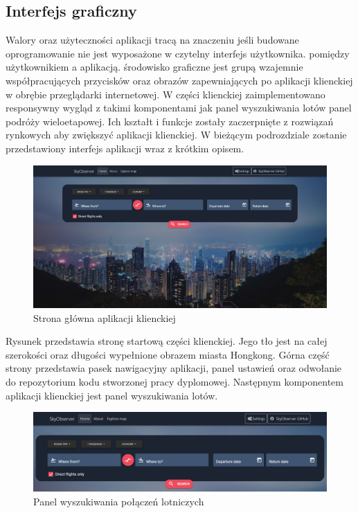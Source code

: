 \documentclass[12pt, twoside]{report}
\begin{document}
\subsection{Interfejs graficzny}
Walory  oraz użyteczności aplikacji tracą na znaczeniu jeśli budowane oprogramowanie nie jest wyposażone w czytelny interfejs użytkownika.  pomiędzy użytkownikiem a aplikacją.   środowisko graficzne jest grupą wzajemnie współpracujących przycisków oraz obrazów zapewniających  po aplikacji klienckiej w obrębie przeglądarki internetowej. 
W części klienckiej zaimplementowano responsywny wygląd z takimi komponentami jak panel wyszukiwania lotów  panel podróży wieloetapowej. Ich  kształt i funkcje zostały  zaczerpnięte z rozwiązań rynkowych aby zwiększyć  aplikacji klienckiej. 
W bieżącym podrozdziale zostanie przedstawiony  interfejs aplikacji wraz z krótkim opisem.
\begin{figure}[!ht]
\centering
\includegraphics[scale=0.32, keepaspectratio]{client_main_page.png}
\caption{Strona główna aplikacji klienckiej}
\label{fig:client_main_page}
\end{figure}
Rysunek  przedstawia stronę startową części klienckiej. Jego tło jest na całej szerokości oraz długości wypełnione obrazem miasta Hongkong. Górna część strony przedstawia pasek nawigacyjny aplikacji, panel ustawień oraz odwołanie do repozytorium kodu stworzonej pracy dyplomowej. Następnym komponentem aplikacji klienckiej jest panel wyszukiwania lotów.
\begin{figure}[!ht]
\centering
\includegraphics[scale=0.39, keepaspectratio]{search_panel.png}
\caption{Panel wyszukiwania połączeń lotniczych}
\label{fig:search_panel}
\end{figure}
\end{document}
